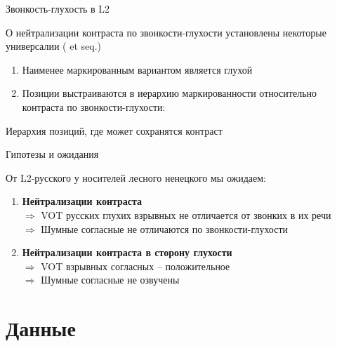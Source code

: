 \documentclass[10 pt, handout]{beamer}
\begin{document}
\begin{frame}[fragile]{Звонкость-глухость в L2}

	О нейтрализации контраста по звонкости-глухости установлены некоторые универсалии (\cite{eckman1977} et seq.)

	\begin{enumerate}[$\gg$]
		\item Наименее маркированным вариантом является глухой
		\item Позиции выстраиваются в иерархию маркированности относительно контраста по звонкости-глухости:
	\end{enumerate}
		
	
	\ex Иерархия позиций, где может сохранятся контраст
	\xe

\end{frame}

\begin{frame}{Гипотезы и ожидания}

	От L2-русского у носителей лесного ненецкого мы ожидаем:

	\begin{enumerate}[$\gg$]
		\item \textbf{Нейтрализации контраста}\\
			$\Rightarrow$ VOT русских глухих взрывных не отличается от звонких в их речи\\
			$\Rightarrow$ Шумные согласные не отличаются по звонкости-глухости
		\item \textbf{Нейтрализации контраста в сторону глухости}\\
			$\Rightarrow$ VOT взрывных согласных -- положительное\\
			$\Rightarrow$ Шумные согласные не озвучены
	\end{enumerate}

\end{frame}

	\section{Данные}
\end{document}
